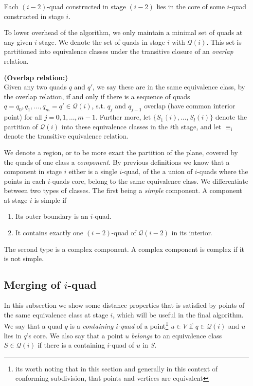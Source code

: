 \begin{Lemma}
Each $(i-2)$-quad constructed in stage $(i-2)$ lies in the core of some $i$-quad constructed in 
stage $i$. 
\end{Lemma}

To lower overhead of the algorithm, we only maintain a minimal set of quads at any given $i$-stage.
We denote the set of quads in stage $i$ with $\mathcal{Q}(i)$. This set is partitioned into 
equivalence classes under the transitive closure of an \textit{overlap} relation. 

\begin{mydef} \textbf{(Overlap relation:)} \\
Given any two quads $q$ and $q'$, we say these are in the same equivalence class, by the overlap 
relation, if and only if there is a sequence of quads $q = q_0, q_1, ..., q_m = q' \in 
\mathcal{Q}(i)$, s.t. $q_j$ and $q_{j+1}$ overlap (have common interior point) for all $j = 0, 1, 
..., m - 1$. Further more, let $\{S_1(i), ..., S_l(i)\}$ denote the partition of $\mathcal{Q}(i)$ 
into these equivalence classes in the $i$th stage, and let $\equiv_i$ denote the transitive 
equivalence relation. 
\end{mydef}

We denote a region, or to be more exact the partition of the plane, covered by the quads of one 
class a \textit{component}. By previous definitions we know that a component in stage $i$ either 
is a single $i$-quad, of the a union of $i$-quads where the points in each $i$-quads core, belong 
to the same equivalence class. We differentiate between two types of classes. The first being a 
\textit{simple} component. A component at stage $i$ is simple if

\begin{enumerate}
\item Its outer boundary is an $i$-quad.
\item It contains exactly one $(i-2)$-quad of $\mathcal{Q}(i-2)$ in its interior.
\end{enumerate}

The second type is a complex component. A complex component is complex if it is not simple.

\subsection{Merging of $i$-quad} \label{section:mergingiquad}

In this subsection we show some distance properties that is satisfied by points of the same 
equivalence class at stage $i$, which will be useful in the final algorithm. We say that a quad 
$q$ is a \textit{containing $i$-quad} of a point\footnote{its worth noting that in this section
and generally in this context of conforming subdivision, that points and vertices are equivalent} 
$u \in V$ if $q \in \mathcal{Q}(i)$ and $u$ lies 
in $q$'s core. We also say that a point $u$ \textit{belongs} to an equivalence class $S \in 
\mathcal{Q}(i)$ if there is a containing $i$-quad of $u$ in $S$.

